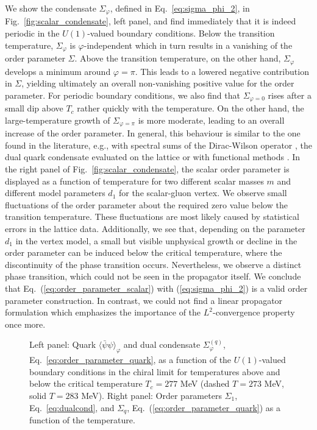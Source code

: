 \documentclass[final,twocolumn,merge,sort&compress]{elsarticle}
\def\Eq#1{Eq.~(\ref{#1})}
\begin{document}
We show the condensate $\Sigma_\varphi$, defined in
Eq.~\eqref{eq:sigma_phi_2}, in Fig.~\ref{fig:scalar_condensate}, left
panel, and find immediately that it is indeed periodic in the
$U(1)$-valued boundary conditions.  Below the transition temperature,
$\Sigma_{\varphi}$ is $\varphi$-independent which in turn results in a
vanishing of the order parameter $\Sigma$. Above the transition
temperature, on the other hand, $\Sigma_\varphi$ develops a minimum
around $\varphi=\pi$.  This leads to a lowered negative contribution
in $\Sigma$, yielding ultimately an overall non-vanishing positive
value for the order parameter. For periodic boundary conditions, we
also find that $\Sigma_{\varphi=0}$ rises after a small dip above
$T_c$ rather quickly with the temperature. On the other hand, the
large-temperature growth of $\Sigma_{\varphi=\pi}$ is more moderate,
leading to an overall increase of the order parameter. In general,
this behaviour is similar to the one found in the literature, e.g.,
with spectral sums of the Dirac-Wilson operator
\cite{Synatschke:2007bz}, the dual quark condensate evaluated on the
lattice \cite{Bilgici:2008qy} or with functional methods
\cite{Fischer:2009wc,Fischer:2009gk,Braun:2009gm,Fischer:2010fx}.  In
the right panel of Fig.~\ref{fig:scalar_condensate}, the scalar order
parameter is displayed as a function of temperature for two different
scalar masses $m$ and different model parameters $d_1$ for the
scalar-gluon vertex. We observe small fluctuations of
the order parameter about the required zero value below the transition temperature.
These fluctuations are most likely caused by statistical 
errors in the lattice data. Additionally, we see that, depending on the 
parameter $d_1$ in the vertex model, a small but visible unphysical growth or decline
in the order parameter can be induced below the critical temperature, where
the discontinuity of the phase transition occurs. Nevertheless,
we observe a distinct phase transition, which
could not be seen in the propagator itself.  We conclude that
\Eq{eq:order_parameter_scalar} with (\ref{eq:sigma_phi_2}) is a valid
order parameter construction. In contrast, we could not find a linear
propagator formulation which emphasizes the importance of the
$L^2$-convergence property once more.

\begin{figure*}
  \centering
  \hfill
  \caption{\label{fig:dse_dual_condensate} Left panel: Quark
    $\langle\bar\psi\psi\rangle_\varphi$ and dual condensate
    $\Sigma_\varphi^{(q)}$, Eq.~\eqref{eq:order_parameter_quark}, as a
    function of the $U(1)$-valued boundary conditions in the chiral
    limit for temperatures above and below the critical temperature
    $T_c=277$ MeV (dashed $T=273$ MeV, solid $T=283$ MeV).  Right
    panel: Order parameters $\Sigma_1$, Eq.~\eqref{eq:dualcond}, and
    $\Sigma_q$, Eq.~(\ref{eq:order_parameter_quark}) as a function of
    the temperature.}
\end{figure*}
\end{document}
